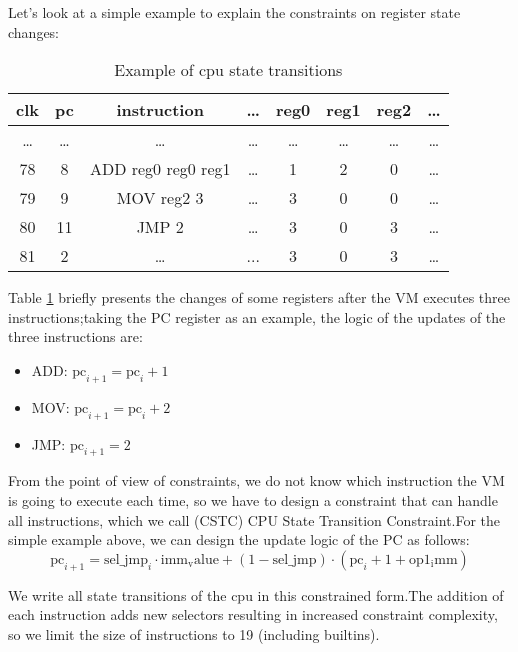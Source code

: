 Let's look at a simple example to explain the constraints on register state changes:
\begin{table}[!ht]
    \centering
    \begin{tabular}{|c|c|c|c|c|c|c|c|}
        \hline
        \rowcolor{gray} clk & pc    & instruction        & \dots & reg0  & reg1  & reg2  & \dots \\
        \hline
        \dots               & \dots & \dots              & \dots & \dots & \dots & \dots & \dots \\
        \hline
        78                  & 8     & ADD reg0 reg0 reg1 & \dots & 1     & 2     & 0     & \dots \\
        \hline
        79                  & 9     & MOV reg2 3         & \dots & 3     & 0     & 0     & \dots \\
        \hline
        80                  & 11    & JMP 2              & \dots & 3     & 0     & 3     & \dots \\
        \hline
        81                  & 2     & \dots              & ...   & 3     & 0     & 3     & \dots \\
        \hline
    \end{tabular}
    \caption{Example of cpu state transitions}
    \label{table:example-cpu-state-transitions}
\end{table}

Table \ref{table:example-cpu-state-transitions} briefly presents the changes of some registers after the VM executes three
instructions;taking the PC register as an example, the logic of the updates of the three instructions are:
\begin{itemize}
    \item ADD: $\mathrm{pc}_{i+1} = \mathrm{pc}_i + 1$
    \item MOV: $\mathrm{pc}_{i+1} = \mathrm{pc}_i + 2$
    \item JMP: $\mathrm{pc}_{i+1} = 2$
\end{itemize}

From the point of view of constraints, we do not know which instruction the VM is going to execute each time, so we have to
design a constraint that can handle all instructions, which we call (CSTC) CPU State Transition Constraint.For the simple
example above, we can design the update logic of the PC as follows:
\[ \mathrm{pc}_{i+1} = \mathrm{sel\_jmp}_i \cdot \mathrm{imm_value} + (1 - \mathrm{sel\_jmp}) \cdot (\mathrm{pc}_i + 1 + \mathrm{op1_imm}) \]

We write all state transitions of the cpu in this constrained form.The addition of each instruction adds new selectors resulting
in increased constraint complexity, so we limit the size of instructions to 19 (including builtins).

